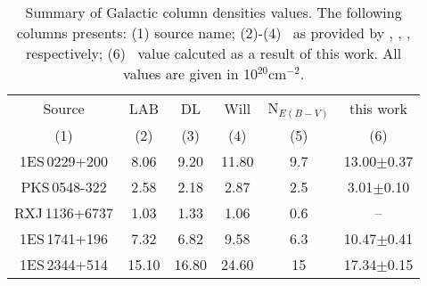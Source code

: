\begin{table} 
\centering 
\begin{tabular}{c|c|c|c|c|c}
\hline
\hline
 Source &  LAB  & DL & Will & N$_{E(B-V)}$  &  this work   \\
(1) &  (2)& (3) & (4) & (5) & (6) \\
\hline
1ES\,0229+200 & 8.06  & 9.20  & 11.80 & 9.7 &13.00$\pm$0.37 \\
PKS\,0548-322 & 2.58  & 2.18  & 2.87 & 2.5 &3.01$\pm$0.10 \\
RXJ\,1136+6737 & 1.03 & 1.33  & 1.06& 0.6& -- \\
1ES\,1741+196 & 7.32 & 6.82  & 9.58 & 6.3 & 10.47$\pm$0.41 \\
1ES\,2344+514 & 15.10 &  16.80 & 24.60 & 15 &17.34$\pm$0.15 \\

\hline
\end{tabular}
\caption[]{Summary of Galactic column densities values. The following columns presents: (1) source name; (2)-(4) \nh\ as provided by \cite{Kalberla2005}, \cite{Dickey1990}, \cite{Willingale13}, respectively; (6) \nh\ value calcuted as a result of this work. 
All values are given in 10$^{20}$cm$^{-2}$. }
  \label{table:nhvalues}
\end{table}



\noindent